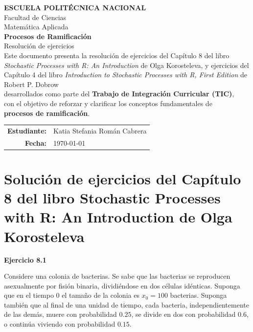 \documentclass{article}
\begin{document}
\begin{center}
\Large \textbf{ESCUELA POLITÉCNICA NACIONAL} \\[0.2cm]
\large Facultad de Ciencias \\[0.2cm]
\large Matemática Aplicada \\[0.8cm]

\Large \textbf{Procesos de Ramificación} \\[0.3cm]
\large Resolución de ejercicios \\[0.8cm]

\normalsize
Este documento presenta la resolución de ejercicios del Capítulo 8 del libro
\textit{Stochastic Processes with R: An Introduction} de Olga Korosteleva, y ejercicios del Capítulo 4 del libro \textit{Introduction to Stochastic Processes with R, First Edition} de Robert P. Dobrow
\\
desarrollados como parte del \textbf{Trabajo de Integración Curricular (TIC)},\\
con el objetivo de reforzar y clarificar los conceptos fundamentales de\\
\textbf{procesos de ramificación}. \\[1cm]

\begin{tabular}{rl}
\textbf{Estudiante:} & Katia Stefania Román Cabrera \\
\textbf{Fecha:} & \today
\end{tabular}

\end{center}

\vspace{1cm}


\section*{Solución de ejercicios del Capítulo 8 del libro Stochastic Processes with R: An Introduction de Olga Korosteleva}

\textbf{Ejercicio 8.1}

Considere una colonia de bacterias. Se sabe que las bacterias se reproducen asexualmente por fisión binaria, dividiéndose en dos células idénticas. Suponga que en el tiempo $0$ el tamaño de la colonia es $x_{0}=100$
 bacterias. Suponga también que al final de una unidad de tiempo, cada bacteria, independientemente de las demás, muere con probabilidad $0.25$, se divide en dos con probabilidad $0.6$, o continúa viviendo con probabilidad $0.15$.
\end{document}
